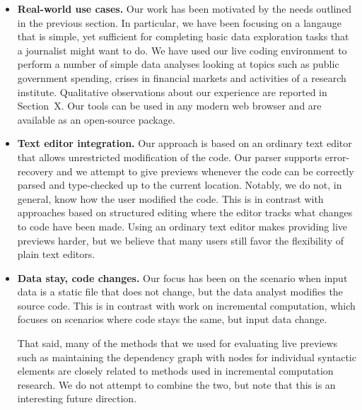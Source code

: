 \documentclass[acmsmall,anonymous,fleqn]{acmart}\settopmatter{printfolios=false,printccs=false,printacmref=false}
\theoremstyle{plain}
\theoremstyle{definition}
\begin{document}
\begin{itemize}
\item\textbf{Real-world use cases.}
Our work has been motivated by the needs outlined in the previous section. In particular, we
have been focusing on a langauge that is simple, yet sufficient for completing basic data
exploration tasks that a journalist might want to do. We have used our live coding environment
to perform a number of simple data analyses looking at topics such as public government spending,
crises in financial markets and activities of a research institute. Qualitative observations about
our experience are reported in Section~X. Our tools can be used in any modern web browser and are
available as an open-source package.

\item\textbf{Text editor integration.}
Our approach is based on an ordinary text editor that allows unrestricted modification of the
code. Our parser supports error-recovery and we attempt to give previews whenever the code can be
correctly parsed and type-checked up to the current location. Notably, we do not, in general, know
how the user modified the code. This is in contrast with approaches based on structured editing
where the editor tracks what changes to code have been made. Using an ordinary text editor makes
providing live previews harder, but we believe that many users still favor the flexibility of
plain text editors.

\item\textbf{Data stay, code changes.}
Our focus has been on the scenario when input data is a static file that does not change, but the
data analyst modifies the source code. This is in contrast with work on incremental computation,
which focuses on scenarios where code stays the same, but input data change.

That said, many of the methods that we used for evaluating live previews such as maintaining
the dependency graph with nodes for individual syntactic elements are closely related to methods
used in incremental computation research. We do not attempt to combine the two, but note that
this is an interesting future direction.
\end{itemize}
\end{document}
